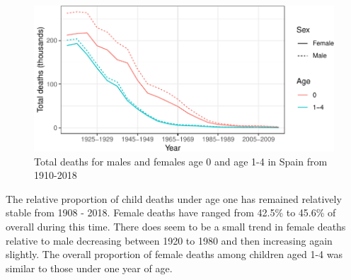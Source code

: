 \documentclass[]{article}
\begin{document}
\begin{figure}
\centering
\includegraphics{dcoomes_hw_10_files/figure-latex/sexmort-1.pdf}
\caption{Total deaths for males and females age 0 and age 1-4 in Spain
from 1910-2018}
\end{figure}

The relative proportion of child deaths under age one has remained
relatively stable from 1908 - 2018. Female deaths have ranged from
42.5\% to 45.6\% of overall during this time. There does seem to be a
small trend in female deaths relative to male decreasing between 1920 to
1980 and then increasing again slightly. The overall proportion of
female deaths among children aged 1-4 was similar to those under one
year of age.
\end{document}
